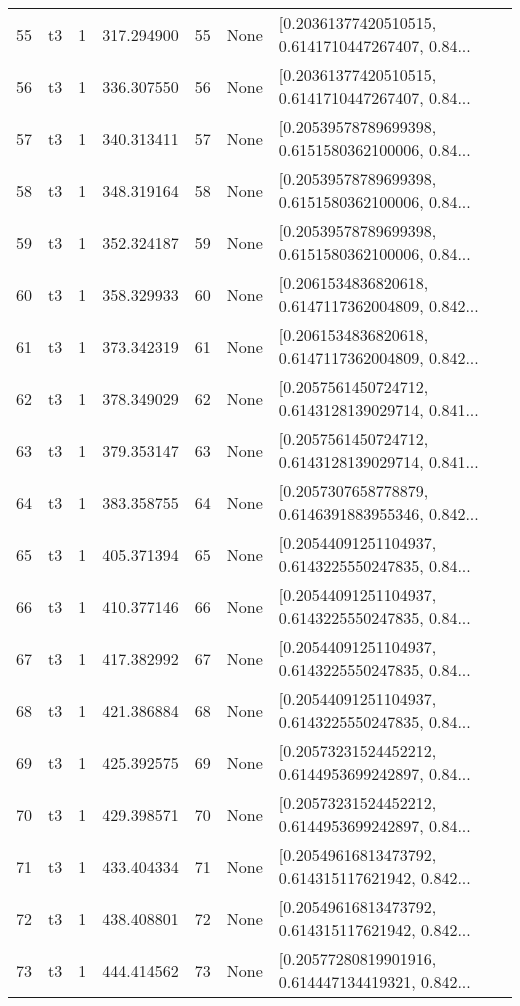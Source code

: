 \begin{tabular}{lllrlll}
55  &  t3 &   1 &  317.294900 &   55 &  None &  [0.20361377420510515, 0.6141710447267407, 0.84... \\
56  &  t3 &   1 &  336.307550 &   56 &  None &  [0.20361377420510515, 0.6141710447267407, 0.84... \\
57  &  t3 &   1 &  340.313411 &   57 &  None &  [0.20539578789699398, 0.6151580362100006, 0.84... \\
58  &  t3 &   1 &  348.319164 &   58 &  None &  [0.20539578789699398, 0.6151580362100006, 0.84... \\
59  &  t3 &   1 &  352.324187 &   59 &  None &  [0.20539578789699398, 0.6151580362100006, 0.84... \\
60  &  t3 &   1 &  358.329933 &   60 &  None &  [0.2061534836820618, 0.6147117362004809, 0.842... \\
61  &  t3 &   1 &  373.342319 &   61 &  None &  [0.2061534836820618, 0.6147117362004809, 0.842... \\
62  &  t3 &   1 &  378.349029 &   62 &  None &  [0.2057561450724712, 0.6143128139029714, 0.841... \\
63  &  t3 &   1 &  379.353147 &   63 &  None &  [0.2057561450724712, 0.6143128139029714, 0.841... \\
64  &  t3 &   1 &  383.358755 &   64 &  None &  [0.2057307658778879, 0.6146391883955346, 0.842... \\
65  &  t3 &   1 &  405.371394 &   65 &  None &  [0.20544091251104937, 0.6143225550247835, 0.84... \\
66  &  t3 &   1 &  410.377146 &   66 &  None &  [0.20544091251104937, 0.6143225550247835, 0.84... \\
67  &  t3 &   1 &  417.382992 &   67 &  None &  [0.20544091251104937, 0.6143225550247835, 0.84... \\
68  &  t3 &   1 &  421.386884 &   68 &  None &  [0.20544091251104937, 0.6143225550247835, 0.84... \\
69  &  t3 &   1 &  425.392575 &   69 &  None &  [0.20573231524452212, 0.6144953699242897, 0.84... \\
70  &  t3 &   1 &  429.398571 &   70 &  None &  [0.20573231524452212, 0.6144953699242897, 0.84... \\
71  &  t3 &   1 &  433.404334 &   71 &  None &  [0.20549616813473792, 0.614315117621942, 0.842... \\
72  &  t3 &   1 &  438.408801 &   72 &  None &  [0.20549616813473792, 0.614315117621942, 0.842... \\
73  &  t3 &   1 &  444.414562 &   73 &  None &  [0.20577280819901916, 0.614447134419321, 0.842... \\

\end{tabular}
